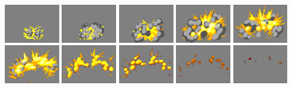 \documentclass[10pt]{book}
\begin{document}
\begin{center}
\includegraphics[width=0.18\textwidth]{previews/nightstrike_0-EXPLODE_BIG-00.png}
\includegraphics[width=0.18\textwidth]{previews/nightstrike_0-EXPLODE_BIG-01.png}
\includegraphics[width=0.18\textwidth]{previews/nightstrike_0-EXPLODE_BIG-02.png}
\includegraphics[width=0.18\textwidth]{previews/nightstrike_0-EXPLODE_BIG-03.png}
\includegraphics[width=0.18\textwidth]{previews/nightstrike_0-EXPLODE_BIG-04.png}
\includegraphics[width=0.18\textwidth]{previews/nightstrike_0-EXPLODE_BIG-05.png}
\includegraphics[width=0.18\textwidth]{previews/nightstrike_0-EXPLODE_BIG-06.png}
\includegraphics[width=0.18\textwidth]{previews/nightstrike_0-EXPLODE_BIG-07.png}
\includegraphics[width=0.18\textwidth]{previews/nightstrike_0-EXPLODE_BIG-08.png}
\includegraphics[width=0.18\textwidth]{previews/nightstrike_0-EXPLODE_BIG-09.png}
\end{center}
\end{document}
